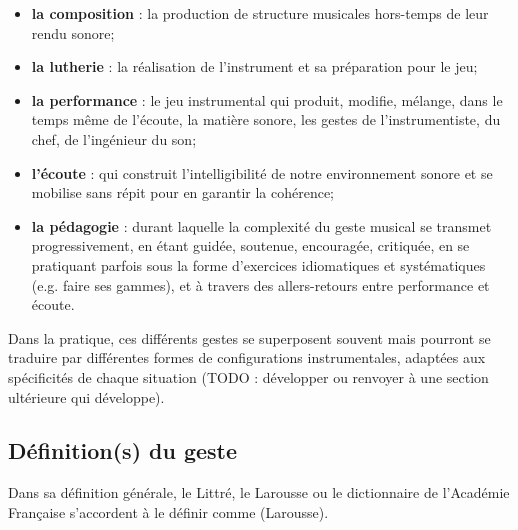 \vspace{-1em}
\begin{itemize}[noitemsep]
\item \textbf{la composition} : la production de structure musicales hors-temps de leur rendu sonore;
\item \textbf{la lutherie} : la réalisation de l'instrument et sa préparation pour le jeu;
\item \textbf{la performance} : le jeu instrumental qui produit, modifie, mélange, dans le temps même de l'écoute, la matière sonore, les gestes de l'instrumentiste, du chef, de l'ingénieur du son;
\item \textbf{l'écoute} : qui construit l'intelligibilité de notre environnement sonore et se mobilise sans répit pour en garantir la cohérence;
\item \textbf{la pédagogie} : durant laquelle la complexité du geste musical se transmet progressivement, en étant guidée, soutenue, encouragée, critiquée, en se pratiquant parfois sous la forme d'exercices idiomatiques et systématiques (e.g. faire ses gammes), et à travers des allers-retours entre performance et écoute.
\end{itemize}

\noindent Dans la pratique, ces différents gestes se superposent souvent mais pourront se traduire par différentes formes de configurations instrumentales, adaptées aux spécificités de chaque situation (TODO : développer ou renvoyer à une section ultérieure qui développe).

\subsection{Définition(s) du geste}

\noindent Dans sa définition générale, le Littré, le Larousse ou le dictionnaire de l'Académie Française s'accordent à le définir comme  (Larousse).

